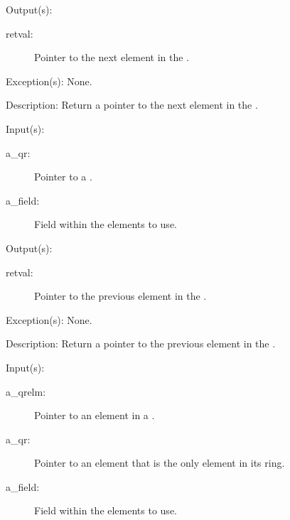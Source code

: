 \begin{capi}
\begin{capilist}
	\item[Output(s): ]
		\begin{description}\item[]
		\item[retval: ]
			Pointer to the next element in the .
		\end{description}
	\item[Exception(s): ] None.
	\item[Description: ]
		Return a pointer to the next element in the .
	\end{capilist}
\label{qr_prev}
	\begin{capilist}
	\item[Input(s): ]
		\begin{description}\item[]
		\item[a\_qr: ]
			Pointer to a .
		\item[a\_field: ]
			Field within the  elements to use.
		\end{description}
	\item[Output(s): ]
		\begin{description}\item[]
		\item[retval: ]
			Pointer to the previous element in the .
		\end{description}
	\item[Exception(s): ] None.
	\item[Description: ]
		Return a pointer to the previous element in the .
	\end{capilist}
\label{qr_before_insert}
	\begin{capilist}
	\item[Input(s): ]
		\begin{description}\item[]
		\item[a\_qrelm: ]
			Pointer to an element in a \classname{qr}.
		\item[a\_qr: ]
			Pointer to an element that is the only element in its
			ring.
		\item[a\_field: ]
			Field within the  elements to use.

\end{description}
\end{capilist}
\end{capi}
